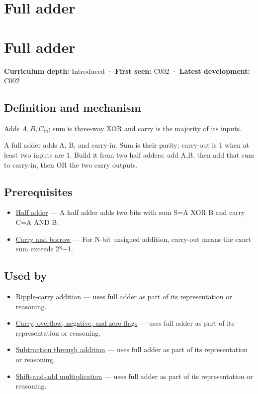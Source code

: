 \hypertarget{appendix-d1a5b1e520c2}{}
\section*{Full adder}
\section{Full adder}\label{full-adder}

\textbf{Curriculum depth:} Introduced · \textbf{First seen:} C002 · \textbf{Latest development:} C002

\subsection{Definition and mechanism}\label{definition-and-mechanism}

Adds \(A,B,C_{in}\); sum is three-way XOR and carry is the majority of its inputs.

A full adder adds A, B, and carry-in. Sum is their parity; carry-out is 1 when at least two inputs are 1. Build it from two half adders: add A,B, then add that sum to carry-in, then OR the two carry outputs.

\subsection{Prerequisites}\label{prerequisites}

\begin{itemize}
\tightlist
\item
  \hyperref[appendix-1652d27a8e90]{Half adder} --- A half adder adds two bits with sum S=A XOR B and carry C=A AND B.
\item
  \hyperref[appendix-d52d5f78ffd1]{Carry and borrow} --- For N-bit unsigned addition, carry-out means the exact sum exceeds 2ᴺ−1.
\end{itemize}

\subsection{Used by}\label{used-by}

\begin{itemize}
\tightlist
\item
  \hyperref[appendix-17917d9fdbe3]{Ripple-carry addition} --- uses full adder as part of its representation or reasoning.
\item
  \hyperref[appendix-8d687c9c08ab]{Carry, overflow, negative, and zero flags} --- uses full adder as part of its representation or reasoning.
\item
  \hyperref[appendix-1c7df340573e]{Subtraction through addition} --- uses full adder as part of its representation or reasoning.
\item
  \hyperref[appendix-a65290d66ed9]{Shift-and-add multiplication} --- uses full adder as part of its representation or reasoning.
\end{itemize}

